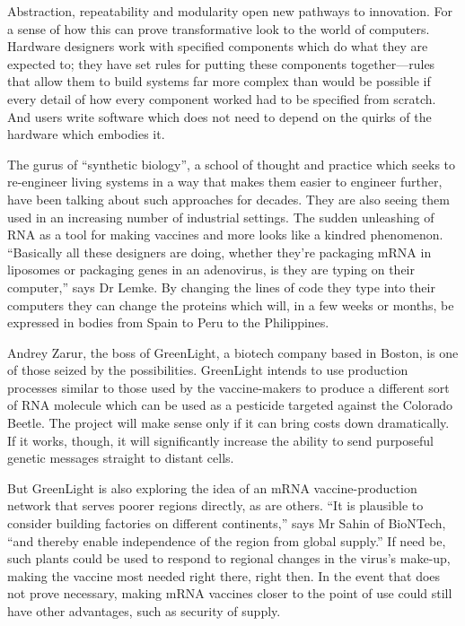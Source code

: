 \documentclass{article}
\begin{document}
Abstraction, repeatability and modularity open new pathways to innovation. For a sense of how this can prove transformative look to the world of computers. Hardware designers work with specified components which do what they are expected to; they have set rules for putting these components together---rules that allow them to build systems far more complex than would be possible if every detail of how every component worked had to be specified from scratch. And users write software which does not need to depend on the quirks of the hardware which embodies it. 

The gurus of ``synthetic biology'', a school of thought and practice which seeks to re-engineer living systems in a way that makes them easier to engineer further, have been talking about such approaches for decades. They are also seeing them used in an increasing number of industrial settings. The sudden unleashing of RNA as a tool for making vaccines and more looks like a kindred phenomenon. ``Basically all these designers are doing, whether they're packaging mRNA in liposomes or packaging genes in an adenovirus, is they are typing on their computer,'' says Dr Lemke. By changing the lines of code they type into their computers they can change the proteins which will, in a few weeks or months, be expressed in bodies from Spain to Peru to the Philippines. 

Andrey Zarur, the boss of GreenLight, a biotech company based in Boston, is one of those seized by the possibilities. GreenLight intends to use production processes similar to those used by the vaccine-makers to produce a different sort of RNA molecule which can be used as a pesticide targeted against the Colorado Beetle. The project will make sense only if it can bring costs down dramatically. If it works, though, it will significantly increase the ability to send purposeful genetic messages straight to distant cells. 

But GreenLight is also exploring the idea of an mRNA vaccine-production network that serves poorer regions directly, as are others. ``It is plausible to consider building factories on different continents,'' says Mr Sahin of BioNTech, ``and thereby enable independence of the region from global supply.'' If need be, such plants could be used to respond to regional changes in the virus's make-up, making the vaccine most needed right there, right then. In the event that does not prove necessary, making mRNA vaccines closer to the point of use could still have other advantages, such as security of supply. 
\end{document}
